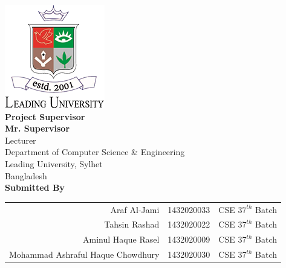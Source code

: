 \vspace{5pt}
\begin{centering} 
    \includegraphics{Graphics/logo.png} \\
    \vspace{10pt}
    \LARGE{\textbf{Project Supervisor}} \\
    \Large{\textbf{Mr. Supervisor}} \\
    \large{Lecturer}\\
    \vspace{5pt}
    Department of Computer Science \& Engineering \\
    Leading University, Sylhet \\
    Bangladesh \\
    \vspace{20pt}
    \Large{\textbf{Submitted By}} \\
    \vspace{5pt}
    \begin{tabular}{r c c}
        {\large Araf Al-Jami} & {\large 1432020033} & {\large CSE $37^{th}$ Batch} \\
        {\large Tahsin Rashad} & {\large 1432020022} & {\large CSE $37^{th}$ Batch} \\
        {\large Aminul Haque Rasel} & {\large 1432020009} & {\large CSE $37^{th}$ Batch} \\
        {\large Mohammad Ashraful Haque Chowdhury} & {\large 1432020030} & {\large CSE $37^{th}$ Batch} \\
    \end{tabular}
\end{centering}

\pagebreak

